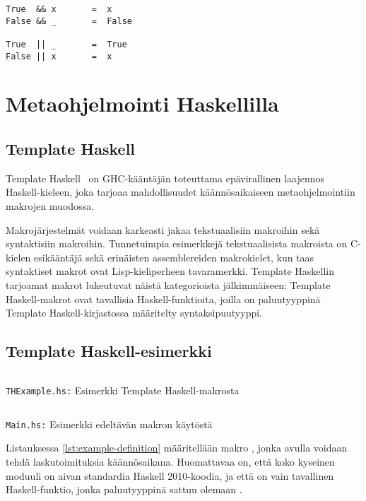 \begin{verbatim}
True  && x       =  x
False && _       =  False

True  || _       =  True
False || x       =  x
\end{verbatim}

\section{Metaohjelmointi Haskellilla}
\subsection{Template Haskell}

Template Haskell~\cite{ThPaper} on GHC-kääntäjän toteuttama epävirallinen laajennos Haskell-kieleen,
joka tarjoaa mahdollisuudet käännösaikaiseen metaohjelmointiin makrojen muodossa.

Makrojärjestelmät voidaan karkeasti jakaa tekstuaalisiin makroihin sekä syntaktisiin makroihin.
Tunnetuimpia esimerkkejä tekstuaalisista makroista on C-kielen esikääntäjä sekä erinäisten assemblereiden makrokielet,
kun taas syntaktiset makrot ovat Lisp-kieliperheen tavaramerkki.
Template Haskellin tarjoamat makrot lukeutuvat näistä kategorioista jälkimmäiseen:
Template Haskell-makrot ovat tavallisia Haskell-funktioita,
joilla on paluutyyppinä Template Haskell-kirjastossa määritelty syntaksipuutyyppi.

\subsection{Template Haskell-esimerkki}

\begin{listing}[H]
    \inputminted{haskell}{codes/compile-time-eval-example/THExample.hs}
    \label{lst:example-definition}
    \caption{\texttt{THExample.hs:} Esimerkki Template Haskell-makrosta}
\end{listing}

\begin{listing}[H]
    \inputminted{haskell}{codes/compile-time-eval-example/Main.hs}
    \label{lst:example-usage}
    \caption{\texttt{Main.hs:} Esimerkki edeltävän makron käytöstä}
\end{listing}

Listauksessa \ref{lst:example-definition} määritellään makro ,
jonka avulla voidaan tehdä laskutoimituksia käännösaikana.
Huomattavaa on, että koko kyseinen moduuli on aivan standardia Haskell 2010-koodia,
ja että  on vain tavallinen Haskell-funktio,
jonka paluutyyppinä sattuu olemaan .

